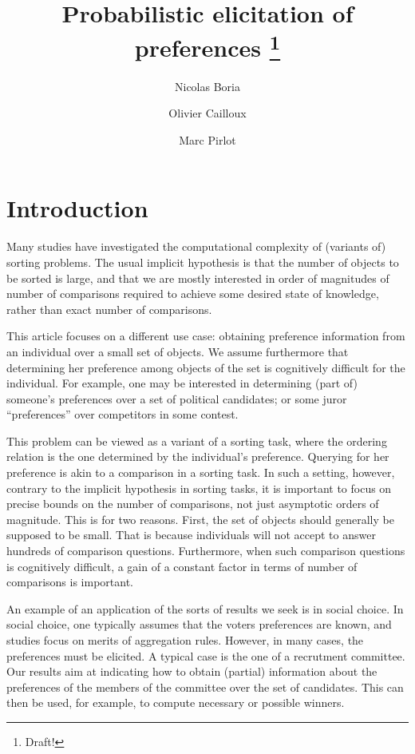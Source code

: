 \documentclass[version=3.21, pagesize, twoside=off, bibliography=totoc, DIV=calc, fontsize=12pt, a4paper]{scrartcl}
\title{Probabilistic elicitation of preferences \thanks{Draft!}}
\author{Nicolas Boria}
\author{Olivier Cailloux}
\author{Marc Pirlot}
\affil{Université Paris-Dauphine, PSL Research University, CNRS, LAMSADE, 75016 PARIS, FRANCE\\
	\href{mailto:olivier.cailloux@dauphine.fr}{olivier.cailloux@dauphine.fr}
}
\begin{document}
\maketitle

\section{Introduction}
Many studies have investigated the computational complexity of (variants of) sorting problems. The usual implicit hypothesis is that the number of objects to be sorted is large, and that we are mostly interested in order of magnitudes of number of comparisons required to achieve some desired state of knowledge, rather than exact number of comparisons.

This article focuses on a different use case: obtaining preference information from an individual over a small set of objects. We assume furthermore that determining her preference among objects of the set is cognitively difficult for the individual. For example, one may be interested in determining (part of) someone’s preferences over a set of political candidates; or some juror “preferences” over competitors in some contest.

This problem can be viewed as a variant of a sorting task, where the ordering relation is the one determined by the individual’s preference. Querying for her preference is akin to a comparison in a sorting task. In such a setting, however, contrary to the implicit hypothesis in sorting tasks, it is important to focus on precise bounds on the number of comparisons, not just asymptotic orders of magnitude. This is for two reasons. First, the set of objects should generally be supposed to be small. That is because individuals will not accept to answer hundreds of comparison questions. Furthermore, when such comparison questions is cognitively difficult, a gain of a constant factor in terms of number of comparisons is important.

An example of an application of the sorts of results we seek is in social choice. In social choice, one typically assumes that the voters preferences are known, and studies focus on merits of aggregation rules. However, in many cases, the preferences must be elicited. A typical case is the one of a recrutment committee. Our results aim at indicating how to obtain (partial) information about the preferences of the members of the committee over the set of candidates. This can then be used, for example, to compute necessary or possible winners.
\end{document}
